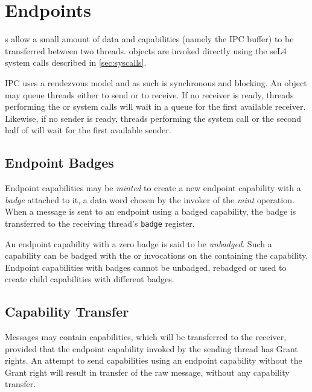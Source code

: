 \section{Endpoints}

s allow a small amount
of data and capabilities (namely the IPC buffer) to be transferred between two
threads.  objects are invoked directly using the seL4 system calls
described in \autoref{sec:syscalls}. 

IPC  uses a rendezvous model and as such is
synchronous and blocking. An  object  may queue
threads either to send or to receive. If no receiver is ready, threads
performing the  or 
system calls will wait in a queue for the first available receiver. Likewise, if
no sender is ready, threads performing the 
system call or the second half of 
will wait for the first available sender.

\subsection{Endpoint Badges\label{s:ep-badge}}
\label{sec:ep-badges}

Endpoint capabilities may be \emph{minted} to
create a new endpoint capability with a \emph{badge} attached to it, a data
word chosen by the invoker of the \emph{mint} operation. When a message is sent to an endpoint using a badged
capability, the badge is transferred to the receiving thread's
\texttt{badge} register.

An endpoint capability with a zero badge is said to be \emph{unbadged}.
Such a capability can be badged with the  or 
invocations on the  containing the capability. Endpoint
capabilities with badges cannot be unbadged, rebadged or used to create
child capabilities with different badges.

\subsection{Capability Transfer}
\label{sec:cap-transfer}

Messages may contain capabilities, which will be transferred to the
receiver, provided that the endpoint capability
invoked by the sending thread has Grant rights. An attempt to send
capabilities using an endpoint capability without the Grant right will
result in transfer of the raw message, without any capability transfer.

